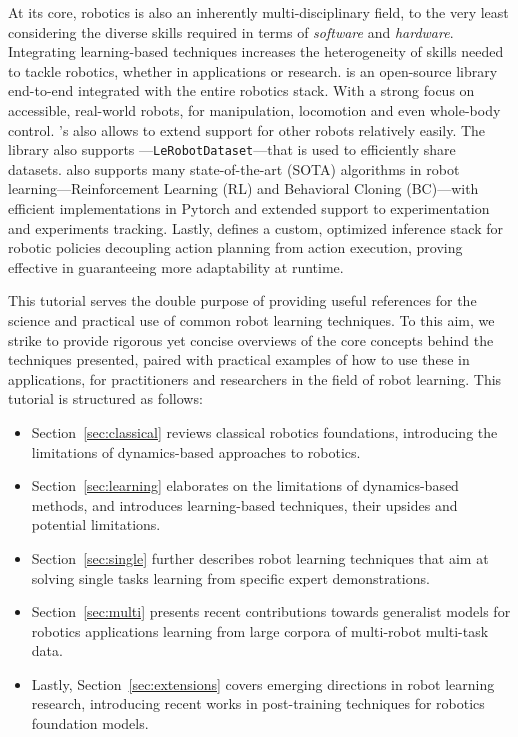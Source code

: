 At its core, robotics is also an inherently multi-disciplinary field, to the very least considering the diverse skills required in terms of \emph{software} and \emph{hardware}.
Integrating learning-based techniques increases the heterogeneity of skills needed to tackle robotics, whether in applications or research.
\lerobot is an open-source library end-to-end integrated with the entire robotics stack.
With a strong focus on accessible, real-world robots,  for manipulation, locomotion and even whole-body control. 
\lerobot's  also allows to extend support for other robots relatively easily. 
The library also supports ---\texttt{LeRobotDataset}---that is used to efficiently share datasets. 
\lerobot also supports many state-of-the-art (SOTA) algorithms in robot learning---Reinforcement Learning (RL) and Behavioral Cloning (BC)---with efficient implementations in Pytorch and extended support to experimentation and experiments tracking.
Lastly, \lerobot defines a custom, optimized inference stack for robotic policies decoupling action planning from action execution, proving effective in guaranteeing more adaptability at runtime.

This tutorial serves the double purpose of providing useful references for the science and practical use of common robot learning techniques.
To this aim, we strike to provide rigorous yet concise overviews of the core concepts behind the techniques presented, paired with practical examples of how to use these in applications, for practitioners and researchers in the field of robot learning.
This tutorial is structured as follows:
\begin{itemize}
\item Section~\ref{sec:classical} reviews classical robotics foundations, introducing the limitations of dynamics-based approaches to robotics.
\item Section~\ref{sec:learning} elaborates on the limitations of dynamics-based methods, and introduces learning-based techniques, their upsides and potential limitations.
\item Section~\ref{sec:single} further describes robot learning techniques that aim at solving single tasks learning from specific expert demonstrations.
\item Section~\ref{sec:multi} presents recent contributions towards generalist models for robotics applications learning from large corpora of multi-robot multi-task data.
\item Lastly, Section~\ref{sec:extensions} covers emerging directions in robot learning research, introducing recent works in post-training techniques for robotics foundation models.
\end{itemize}

